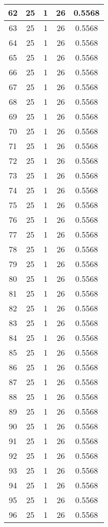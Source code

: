 \documentclass[letterpaper, 12pt]{article}
\begin{document}
\begin{longtable}{|c|c|c|c|c|}
\hline
62 & 25 & 1 & 26 & 0.5568 \\
\hline
63 & 25 & 1 & 26 & 0.5568 \\
\hline
64 & 25 & 1 & 26 & 0.5568 \\
\hline
65 & 25 & 1 & 26 & 0.5568 \\
\hline
66 & 25 & 1 & 26 & 0.5568 \\
\hline
67 & 25 & 1 & 26 & 0.5568 \\
\hline
68 & 25 & 1 & 26 & 0.5568 \\
\hline
69 & 25 & 1 & 26 & 0.5568 \\
\hline
70 & 25 & 1 & 26 & 0.5568 \\
\hline
71 & 25 & 1 & 26 & 0.5568 \\
\hline
72 & 25 & 1 & 26 & 0.5568 \\
\hline
73 & 25 & 1 & 26 & 0.5568 \\
\hline
74 & 25 & 1 & 26 & 0.5568 \\
\hline
75 & 25 & 1 & 26 & 0.5568 \\
\hline
76 & 25 & 1 & 26 & 0.5568 \\
\hline
77 & 25 & 1 & 26 & 0.5568 \\
\hline
78 & 25 & 1 & 26 & 0.5568 \\
\hline
79 & 25 & 1 & 26 & 0.5568 \\
\hline
80 & 25 & 1 & 26 & 0.5568 \\
\hline
81 & 25 & 1 & 26 & 0.5568 \\
\hline
82 & 25 & 1 & 26 & 0.5568 \\
\hline
83 & 25 & 1 & 26 & 0.5568 \\
\hline
84 & 25 & 1 & 26 & 0.5568 \\
\hline
85 & 25 & 1 & 26 & 0.5568 \\
\hline
86 & 25 & 1 & 26 & 0.5568 \\
\hline
87 & 25 & 1 & 26 & 0.5568 \\
\hline
88 & 25 & 1 & 26 & 0.5568 \\
\hline
89 & 25 & 1 & 26 & 0.5568 \\
\hline
90 & 25 & 1 & 26 & 0.5568 \\
\hline
91 & 25 & 1 & 26 & 0.5568 \\
\hline
92 & 25 & 1 & 26 & 0.5568 \\
\hline
93 & 25 & 1 & 26 & 0.5568 \\
\hline
94 & 25 & 1 & 26 & 0.5568 \\
\hline
95 & 25 & 1 & 26 & 0.5568 \\
\hline
96 & 25 & 1 & 26 & 0.5568 \\

\end{longtable}
\end{document}

